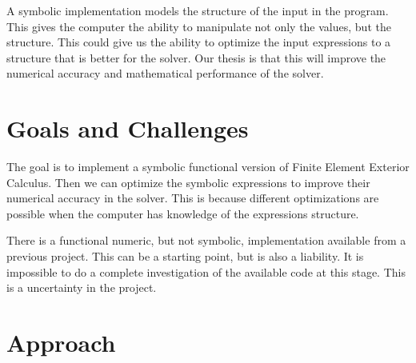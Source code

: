 \documentclass{scrartcl}
\begin{document}

A symbolic implementation models the structure of the input in the
program.  This gives the computer the ability to manipulate not only
the values, but the structure. This could give us the ability to
optimize the input expressions to a structure that is better for the
solver. Our thesis is that this will improve the numerical accuracy
and mathematical performance of the solver.




\section{Goals and Challenges}

The goal is to implement a symbolic functional version of Finite
Element Exterior Calculus.  Then we can optimize the symbolic expressions to
improve their numerical accuracy in the solver. This is because
different optimizations are possible when the computer has knowledge
of the expressions structure.



There is a functional numeric, but not symbolic, implementation
available from a previous project. This can be a starting point, but
is also a liability.  It is impossible to do a complete investigation
of the available code at this stage.  This is a uncertainty in the
project.


\section{Approach}
\end{document}
